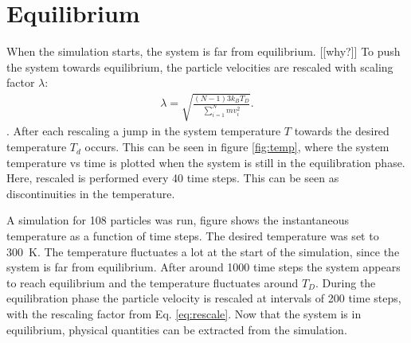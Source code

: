 \section{Equilibrium}
When the simulation starts, the system is far from equilibrium. [[why?]] To push the system towards equilibrium, the particle velocities are rescaled with scaling factor $\lambda$:
\begin{gather}\label{eq:rescale}
    \lambda=\sqrt{\frac{(N-1)3k_BT_D}{\sum_{i=1}^{N} mv_i^{2}}}.
\end{gather}. After each rescaling a jump in the system temperature $T$ towards the desired temperature $T_d$ occurs. This can be seen in figure \ref{fig:temp}, where the system temperature vs time is plotted when the system is still in the equilibration phase. Here, rescaled is performed every 40 time steps. This can be seen as discontinuities in the temperature. 



A simulation for 108 particles was run, figure %
shows the instantaneous temperature as a function of time steps. The desired temperature was set to 300~K. The temperature fluctuates a lot at the start of the simulation, since the system is far from equilibrium. After around 1000 time steps the system appears to reach equilibrium and the temperature fluctuates around $T_D$. During the equilibration phase the particle velocity is rescaled at intervals of 200 time steps, with the rescaling factor from Eq. \ref{eq:rescale}. Now that the system is in equilibrium, physical quantities can be extracted from the simulation.